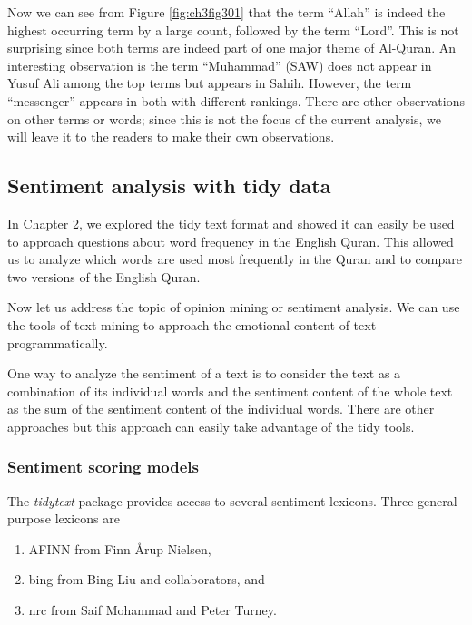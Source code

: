 \documentclass[
]{article}
\providecommand{\tightlist}{%
  \setlength{\itemsep}{0pt}\setlength{\parskip}{0pt}}
\begin{document}
Now we can see from Figure \ref{fig:ch3fig301} that the term ``Allah'' is indeed the highest occurring term by a large count, followed by the term ``Lord''. This is not surprising since both terms are indeed part of one major theme of Al-Quran. An interesting observation is the term ``Muhammad'' (SAW) does not appear in Yusuf Ali among the top terms but appears in Sahih. However, the term ``messenger'' appears in both with different rankings. There are other observations on other terms or words; since this is not the focus of the current analysis, we will leave it to the readers to make their own observations.

\hypertarget{sentiment-analysis-with-tidy-data}{%
\subsection{Sentiment analysis with tidy data}\label{sentiment-analysis-with-tidy-data}}

In Chapter 2, we explored the tidy text format and showed it can easily be used to approach questions about word frequency in the English Quran. This allowed us to analyze which words are used most frequently in the Quran and to compare two versions of the English Quran.

Now let us address the topic of opinion mining or sentiment analysis. We can use the tools of text mining to approach the emotional content of text programmatically.

One way to analyze the sentiment of a text is to consider the text as a combination of its individual words and the sentiment content of the whole text as the sum of the sentiment content of the individual words. There are other approaches but this approach can easily take advantage of the tidy tools.

\hypertarget{sentiment-scoring-models}{%
\subsubsection{Sentiment scoring models}\label{sentiment-scoring-models}}

The \emph{tidytext} package provides access to several sentiment lexicons. Three general-purpose lexicons are

\begin{enumerate}
\def\labelenumi{\arabic{enumi}.}
\tightlist
\item
  AFINN from Finn Årup Nielsen,
\item
  bing from Bing Liu and collaborators, and
\item
  nrc from Saif Mohammad and Peter Turney.
\end{enumerate}
\end{document}
